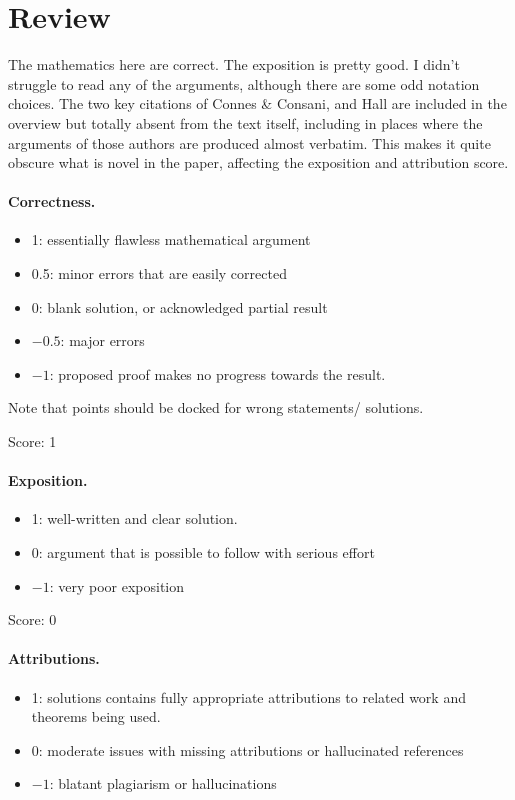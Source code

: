 \documentclass[11pt]{article}
\theoremstyle{definition}
\theoremstyle{remark}
\begin{document}
\maketitle

\section{Review}
{\color{gray} 



The mathematics here are correct. The exposition is pretty good. I didn't struggle to read any of the arguments, although there are some odd notation choices. The two key citations of Connes \& Consani, and Hall are included in the overview but totally absent from the text itself, including in places where the arguments of those authors are produced almost verbatim. This makes it quite obscure what is novel in the paper, affecting the exposition and attribution score.}

\paragraph{Correctness.}
\begin{itemize}
	\item  1: essentially flawless mathematical argument
	\item  0.5: minor errors that are easily corrected
	\item  0: blank solution, or acknowledged partial result
	\item  $-0.5$: major errors
	\item  $-1$: proposed proof makes no progress towards the result.
\end{itemize}
Note that points should be docked for wrong statements/ solutions.

\noindent Score: 1

\paragraph{Exposition.}
\begin{itemize}
	\item  1: well-written and clear solution.
	\item  0: argument that is possible to follow with serious effort
	\item  $-1$: very poor exposition
\end{itemize}

\noindent Score: 0

\paragraph{Attributions.}
\begin{itemize}
	\item  1: solutions contains fully appropriate attributions
		to related work and theorems being used.
	\item  0: moderate issues with missing attributions or hallucinated references
	\item  $-1$: blatant plagiarism or hallucinations
\end{itemize}
\end{document}
